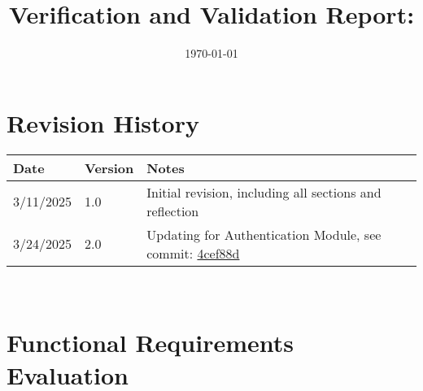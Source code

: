 \documentclass[12pt, titlepage]{article}
\begin{document}
\title{Verification and Validation Report: \progname} 
\author{\authname}
\date{\today}
	
\maketitle


\section{Revision History}

\begin{tabularx}{\textwidth}{p{3cm}p{2cm}X}
\toprule {\bf Date} & {\bf Version} & {\bf Notes}\\
\midrule
3/11/2025 & 1.0 & Initial revision, including all sections and reflection\\
3/24/2025 & 2.0 & Updating for Authentication Module, see commit: \href{https://github.com/ausbennett/mes-finance-platform/commit/4cef88de4d7c2a664fa8e2395804251c0a6baeb4}{4cef88d}\\
\bottomrule
\end{tabularx}

~\newpage




\newpage

\tableofcontents

\listoftables %

\newpage


\newpage

\section{Functional Requirements Evaluation}
\end{document}
